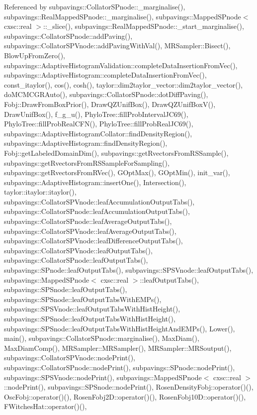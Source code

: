 \-Referenced by subpavings\-::\-Collator\-S\-Pnode\-::\-\_\-marginalise(), subpavings\-::\-Real\-Mapped\-S\-Pnode\-::\-\_\-marginalise(), subpavings\-::\-Mapped\-S\-Pnode$<$ cxsc\-::real $>$\-::\-\_\-slice(), subpavings\-::\-Real\-Mapped\-S\-Pnode\-::\-\_\-start\-\_\-marginalise(), subpavings\-::\-Collator\-S\-Pnode\-::add\-Paving(), subpavings\-::\-Collator\-S\-P\-Vnode\-::add\-Paving\-With\-Val(), \-M\-R\-Sampler\-::\-Bisect(), \-Blow\-Up\-From\-Zero(), subpavings\-::\-Adaptive\-Histogram\-Validation\-::complete\-Data\-Insertion\-From\-Vec(), subpavings\-::\-Adaptive\-Histogram\-::complete\-Data\-Insertion\-From\-Vec(), const\-\_\-itaylor(), cos(), cosh(), taylor\-::dim2taylor\-\_\-vector\-::dim2taylor\-\_\-vector(), do\-M\-C\-M\-C\-G\-R\-Auto(), subpavings\-::\-Collator\-S\-Pnode\-::dot\-Diff\-Paving(), \-Fobj\-::\-Draw\-From\-Box\-Prior(), \-Draw\-Q\-Z\-Unif\-Box(), \-Draw\-Q\-Z\-Unif\-Box\-V(), \-Draw\-Unif\-Box(), f\-\_\-g\-\_\-u(), \-Phylo\-Tree\-::fill\-Prob\-Interval\-J\-C69(), \-Phylo\-Tree\-::fill\-Prob\-Real\-C\-F\-N(), \-Phylo\-Tree\-::fill\-Prob\-Real\-J\-C69(), subpavings\-::\-Adaptive\-Histogram\-Collator\-::find\-Density\-Region(), subpavings\-::\-Adaptive\-Histogram\-::find\-Density\-Region(), \-Fobj\-::get\-Labeled\-Domain\-Dim(), subpavings\-::get\-Rvectors\-From\-R\-S\-Sample(), subpavings\-::get\-Rvectors\-From\-R\-S\-Sample\-For\-Sampling(), subpavings\-::get\-Rvectors\-From\-R\-Vec(), \-G\-Opt\-Max(), \-G\-Opt\-Min(), init\-\_\-var(), subpavings\-::\-Adaptive\-Histogram\-::insert\-One(), \-Intersection(), taylor\-::itaylor\-::itaylor(), subpavings\-::\-Collator\-S\-P\-Vnode\-::leaf\-Accumulation\-Output\-Tabs(), subpavings\-::\-Collator\-S\-Pnode\-::leaf\-Accumulation\-Output\-Tabs(), subpavings\-::\-Collator\-S\-Pnode\-::leaf\-Average\-Output\-Tabs(), subpavings\-::\-Collator\-S\-P\-Vnode\-::leaf\-Average\-Output\-Tabs(), subpavings\-::\-Collator\-S\-P\-Vnode\-::leaf\-Difference\-Output\-Tabs(), subpavings\-::\-Collator\-S\-P\-Vnode\-::leaf\-Output\-Tabs(), subpavings\-::\-Collator\-S\-Pnode\-::leaf\-Output\-Tabs(), subpavings\-::\-S\-Pnode\-::leaf\-Output\-Tabs(), subpavings\-::\-S\-P\-S\-Vnode\-::leaf\-Output\-Tabs(), subpavings\-::\-Mapped\-S\-Pnode$<$ cxsc\-::real $>$\-::leaf\-Output\-Tabs(), subpavings\-::\-S\-P\-Snode\-::leaf\-Output\-Tabs(), subpavings\-::\-S\-P\-Snode\-::leaf\-Output\-Tabs\-With\-E\-M\-Ps(), subpavings\-::\-S\-P\-S\-Vnode\-::leaf\-Output\-Tabs\-With\-Hist\-Height(), subpavings\-::\-S\-P\-Snode\-::leaf\-Output\-Tabs\-With\-Hist\-Height(), subpavings\-::\-S\-P\-Snode\-::leaf\-Output\-Tabs\-With\-Hist\-Height\-And\-E\-M\-Ps(), \-Lower(), main(), subpavings\-::\-Collator\-S\-Pnode\-::marginalise(), \-Max\-Diam(), \-Max\-Diam\-Comp(), \-M\-R\-Sampler\-::\-M\-R\-Sampler(), \-M\-R\-Sampler\-::\-M\-R\-Soutput(), subpavings\-::\-Collator\-S\-P\-Vnode\-::node\-Print(), subpavings\-::\-Collator\-S\-Pnode\-::node\-Print(), subpavings\-::\-S\-Pnode\-::node\-Print(), subpavings\-::\-S\-P\-S\-Vnode\-::node\-Print(), subpavings\-::\-Mapped\-S\-Pnode$<$ cxsc\-::real $>$\-::node\-Print(), subpavings\-::\-S\-P\-Snode\-::node\-Print(), \-Rosen\-Density\-Fobj\-::operator()(), \-Osc\-Fobj\-::operator()(), \-Rosen\-Fobj2\-D\-::operator()(), \-Rosen\-Fobj10\-D\-::operator()(), \-F\-Witches\-Hat\-::operator()(), 